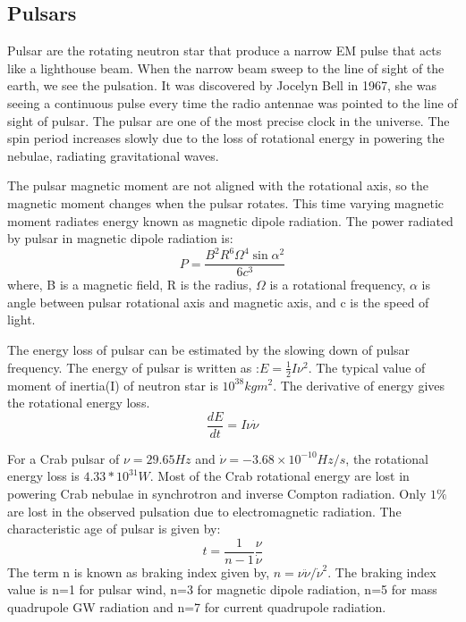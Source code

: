 \documentclass{ttuthes2007}
\begin{document}
\subsection{Pulsars}
Pulsar are the rotating neutron star that produce a narrow \ac{EM} pulse that
acts like a lighthouse beam. When the narrow beam sweep to the line of sight of
the earth, we see the pulsation.  It was discovered by Jocelyn Bell in 1967, she
was seeing a continuous pulse every time the radio antennae was pointed to the
line of sight of pulsar. The pulsar are one of the most precise clock in the
universe. The spin period increases slowly due to the loss of rotational energy
in powering the nebulae, radiating gravitational waves. 

The pulsar magnetic moment are not aligned with the rotational axis, so the
magnetic moment changes when the pulsar rotates. This time varying magnetic
moment radiates energy known as magnetic dipole radiation. The power radiated by
pulsar in magnetic dipole radiation is:
\begin{equation}
P= \frac{B^2R^6\Omega^4\sin{\alpha}^2}{6c^3}
\end{equation}
where, B is a magnetic field, R is the radius, $\Omega$ is a rotational
frequency, $\alpha$ is angle between pulsar rotational axis and magnetic axis,
and c is the speed of light.  

The energy loss of pulsar can be estimated by the slowing down of pulsar
frequency. The energy of pulsar is written as :$E=\frac{1}{2} I \nu^2$. The
typical value of moment of inertia(I) of neutron star is $10^{38}kgm^2$. The
derivative of energy gives the rotational energy loss.
\begin{equation}
\frac{dE}{dt}= I\nu\dot{\nu}
\end{equation}

For a Crab pulsar of $\nu=29.65Hz$ and $\dot{\nu}= -3.68\times10^{-10}Hz/s$, the
rotational energy loss is $4.33*10^{31}W$. Most of the Crab rotational energy
are lost in powering Crab nebulae in synchrotron and inverse Compton radiation.
Only $1\%$ are lost  in the observed pulsation due to electromagnetic radiation.
The characteristic age of pulsar is given by:
\begin{equation}
t= \frac{1}{n-1}\frac{\nu}{\dot{\nu}}
\end{equation} 
The term n is known as braking index given by, $n=\nu\ddot{\nu}/\dot{\nu}^2$. 
The braking index value is n=1 for pulsar wind, n=3 for magnetic dipole
radiation, n=5 for mass quadrupole \ac{GW} radiation and n=7 for current
quadrupole radiation.
\end{document}
